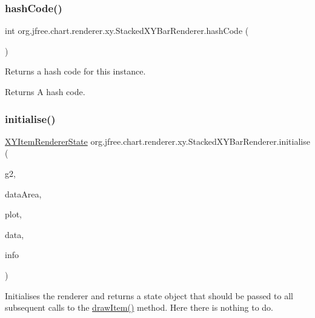\subsubsection{\texorpdfstring{hash\+Code()}{hashCode()}}
{\footnotesize\ttfamily int org.\+jfree.\+chart.\+renderer.\+xy.\+Stacked\+X\+Y\+Bar\+Renderer.\+hash\+Code (\begin{DoxyParamCaption}{ }\end{DoxyParamCaption})}

Returns a hash code for this instance.

\begin{DoxyReturn}{Returns}
A hash code. 
\end{DoxyReturn}
\mbox{\label{classorg_1_1jfree_1_1chart_1_1renderer_1_1xy_1_1_stacked_x_y_bar_renderer_adff6241ebd96bf8e25101cc9684f5afd}} 
\subsubsection{\texorpdfstring{initialise()}{initialise()}}
{\footnotesize\ttfamily \mbox{\hyperlink{classorg_1_1jfree_1_1chart_1_1renderer_1_1xy_1_1_x_y_item_renderer_state}{X\+Y\+Item\+Renderer\+State}} org.\+jfree.\+chart.\+renderer.\+xy.\+Stacked\+X\+Y\+Bar\+Renderer.\+initialise (\begin{DoxyParamCaption}\item[{Graphics2D}]{g2,  }\item[{Rectangle2D}]{data\+Area,  }\item[{\mbox{\hyperlink{classorg_1_1jfree_1_1chart_1_1plot_1_1_x_y_plot}{X\+Y\+Plot}}}]{plot,  }\item[{\mbox{\hyperlink{interfaceorg_1_1jfree_1_1data_1_1xy_1_1_x_y_dataset}{X\+Y\+Dataset}}}]{data,  }\item[{\mbox{\hyperlink{classorg_1_1jfree_1_1chart_1_1plot_1_1_plot_rendering_info}{Plot\+Rendering\+Info}}}]{info }\end{DoxyParamCaption})}

Initialises the renderer and returns a state object that should be passed to all subsequent calls to the \mbox{\hyperlink{classorg_1_1jfree_1_1chart_1_1renderer_1_1xy_1_1_stacked_x_y_bar_renderer_a9fd2304b638c968d23773a3ccf2c8d39}{draw\+Item()}} method. Here there is nothing to do.


